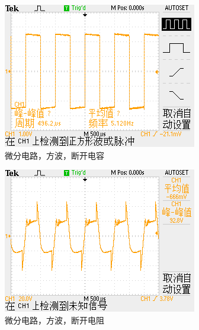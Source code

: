 \documentclass{ctexart}
\begin{document}
\begin{figure}[H]
  \centering
  \begin{subfigure}{.32\textwidth}
    \centering
    \includegraphics[width=\linewidth]{电路图像/微分电路/输入方波/方波有电阻无电容}
    \caption{微分电路，方波，断开电容}
  \end{subfigure}
  \begin{subfigure}{.32\textwidth}
    \centering
    \includegraphics[width=\linewidth]{电路图像/微分电路/输入方波/方波无电阻有电容}
    \caption{微分电路，方波，断开电阻}
  \end{subfigure}
  \begin{subfigure}{.32\textwidth}
    \centering

\end{subfigure}
\end{figure}
\end{document}
